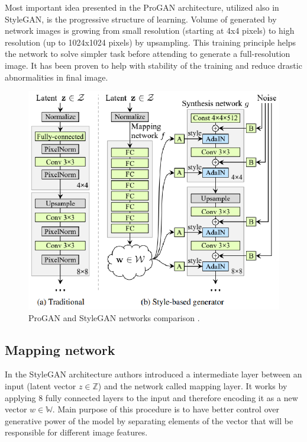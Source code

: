 \documentclass[12pt,a4paper,openany]{book}
\begin{document}
\noindent Most important idea presented in the ProGAN architecture, utilized also in StyleGAN, is the progressive structure of learning. Volume of generated by network images is growing from small resolution (starting at 4x4 pixels) to high resolution (up to 1024x1024 pixels) by upsampling. This training principle helps the network to solve simpler task before attending to generate a full-resolution image. It has been proven to help with stability of the training and reduce drastic abnormalities in final image.

\begin{figure}[ht!]
    \centering
    \includegraphics[scale=1.5]{figs/stylegan-scheme.eps}
    \caption{ProGAN and StyleGAN networks comparison \cite{stylegan}.}\label{Fig:proganistylegan}
\end{figure}

\subsection{Mapping network}

\noindent In the StyleGAN architecture authors introduced a intermediate layer between an input (latent vector $z \in \mathbb{Z}$) and the network called mapping layer. It works by applying 8 fully connected layers to the input and therefore encoding it as a new vector $w \in \mathbb{W}$. Main purpose of this procedure is to have better control over generative power of the model by separating elements of the vector that will be responsible for different image features.
\end{document}

